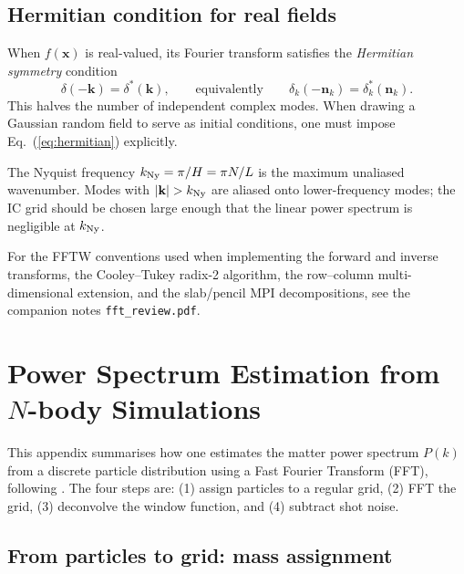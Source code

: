 \documentclass[12pt]{article}
\newcommand{\bx}{\mathbf{x}}
\newcommand{\bk}{\mathbf{k}}
\begin{document}
\subsection{Hermitian condition for real fields}
\label{app:fft_hermitian}

When $f(\bx)$ is real-valued, its Fourier transform satisfies the
\emph{Hermitian symmetry} condition
%
\begin{equation}
  \delta(-\bk) = \delta^*(\bk),
  \qquad\text{equivalently}\qquad
  \delta_k(-\mathbf{n}_k) = \delta_k^*(\mathbf{n}_k).
  \label{eq:hermitian}
\end{equation}
%
This halves the number of independent complex modes.  When drawing
a Gaussian random field to serve as initial conditions, one must
impose Eq.~(\ref{eq:hermitian}) explicitly.

The Nyquist frequency $k_{\rm Ny} = \pi/H = \pi N/L$ is the maximum
unaliased wavenumber.  Modes with $|\bk| > k_{\rm Ny}$ are aliased
onto lower-frequency modes; the IC grid should be chosen large enough
that the linear power spectrum is negligible at $k_{\rm Ny}$.

For the FFTW conventions used when implementing the forward and
inverse transforms, the Cooley--Tukey radix-2 algorithm, the
row--column multi-dimensional extension, and the slab/pencil MPI
decompositions, see the companion notes \texttt{fft\_review.pdf}.

\section{Power Spectrum Estimation from $N$-body Simulations}
\label{app:pk}

This appendix summarises how one estimates the matter power spectrum
$P(k)$ from a discrete particle distribution using a Fast Fourier
Transform (FFT), following \citet{Jeong2010}.  The four steps are:
(1) assign particles to a regular grid, (2) FFT the grid,
(3) deconvolve the window function, and (4) subtract shot noise.

\subsection{From particles to grid: mass assignment}
\label{app:pk_assign}
\end{document}
